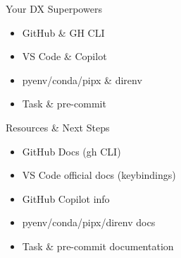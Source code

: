\documentclass[aspectratio=169]{beamer}
\begin{document}
%
\begin{frame}{Your DX Superpowers}
\begin{itemize}
  \item GitHub \& GH CLI
  \item VS Code \& Copilot
  \item pyenv/conda/pipx \& direnv
  \item Task \& pre-commit
\end{itemize}
\vspace{-1em}  %
\end{frame}

\begin{frame}{Resources \& Next Steps}
\begin{itemize}
\item GitHub Docs (gh CLI)
\item VS Code official docs (keybindings)
\item GitHub Copilot info
\item pyenv/conda/pipx/direnv docs
\item Task \& pre-commit documentation
\end{itemize}\label{lastpage}
\end{frame}
\end{document}
